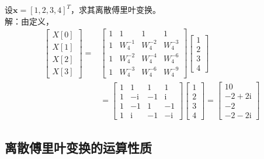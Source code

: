 \begin{example}
    设$\mathbf{x}=[1,2,3,4]^T$，求其离散傅里叶变换。\\
    解：由定义，
    \begin{align*}
        \begin{bmatrix}
            X[0]  \\
            X[1]  \\
            X[2]  \\
            X[3]
        \end{bmatrix}=&\begin{bmatrix}1 & 1 & 1 & 1 \\
        1 & W_4^{-1} & W_4^{-2} & W_4^{-3} \\
        1 & W_4^{-2} & W_4^{-4} & W_4^{-6} \\
        1 & W_4^{-3} & W_4^{-6} & W_4^{-9}
        \end{bmatrix}\begin{bmatrix}
            1  \\
            2  \\
            3  \\
            4
        \end{bmatrix}\\
        &=\begin{bmatrix}
        1 & 1 & 1 & 1 \\
        1 & -\mathrm{i} & -1 & \mathrm{i} \\
        1 & -1 & 1 & -1 \\
        1 & \mathrm{i} & -1 & -\mathrm{i}
        \end{bmatrix}\begin{bmatrix}
            1  \\
            2  \\
            3  \\
            4
        \end{bmatrix}=\begin{bmatrix}
            10  \\
            -2+2\mathrm{i}  \\
            -2  \\
            -2-2\mathrm{i}
        \end{bmatrix}
    \end{align*}
\end{example}

\subsection{离散傅里叶变换的运算性质}\label{sub:property_of_DFT}

